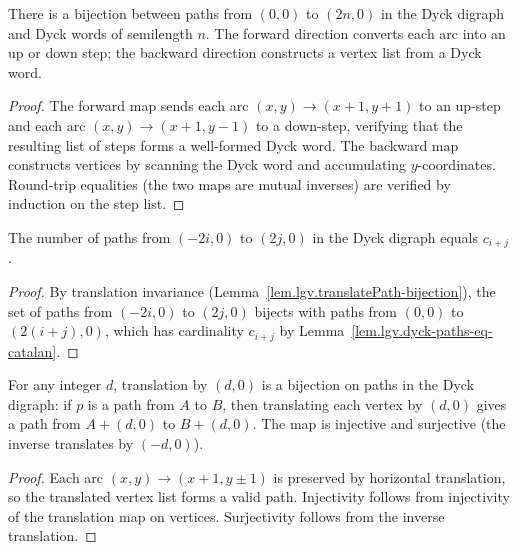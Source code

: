 \begin{lemma}
\label{lem.lgv.dyck-path-bijection}
\leanhelper
\leanok
There is a bijection between paths from $(0, 0)$ to $(2n, 0)$ in
the Dyck digraph and Dyck words of semilength $n$.
The forward direction converts each arc into an up or down step;
the backward direction constructs a vertex list from a Dyck word.
\end{lemma}

\begin{proof}
\leanok
The forward map sends each arc $(x, y) \to (x+1, y+1)$ to an up-step
and each arc $(x, y) \to (x+1, y-1)$ to a down-step, verifying that
the resulting list of steps forms a well-formed Dyck word.  The backward
map constructs vertices by scanning the Dyck word and accumulating
$y$-coordinates.  Round-trip equalities (the two maps are mutual inverses)
are verified by induction on the step list.
\end{proof}

\begin{lemma}
\label{lem.lgv.dyck-paths-shifted}
\leanhelper
\leanok
The number of paths from $(-2i, 0)$ to $(2j, 0)$ in the Dyck digraph
equals $c_{i+j}$.
\end{lemma}

\begin{proof}
\leanok
By translation invariance
(Lemma~\ref{lem.lgv.translatePath-bijection}), the set of paths
from $(-2i, 0)$ to $(2j, 0)$ bijects with paths from $(0, 0)$
to $(2(i+j), 0)$, which has cardinality $c_{i+j}$ by
Lemma~\ref{lem.lgv.dyck-paths-eq-catalan}.
\end{proof}

\begin{lemma}
\label{lem.lgv.translatePath-bijection}
For any integer $d$, translation by $(d, 0)$ is a bijection on paths
in the Dyck digraph: if $p$ is a path from $A$ to $B$, then translating
each vertex by $(d, 0)$ gives a path from $A + (d, 0)$ to $B + (d, 0)$.
The map is injective and surjective (the inverse translates by $(-d, 0)$).
\end{lemma}

\begin{proof}
Each arc $(x, y) \to (x+1, y \pm 1)$ is preserved by horizontal translation,
so the translated vertex list forms a valid path.  Injectivity follows
from injectivity of the translation map on vertices.
Surjectivity follows from the inverse translation.
\end{proof}

